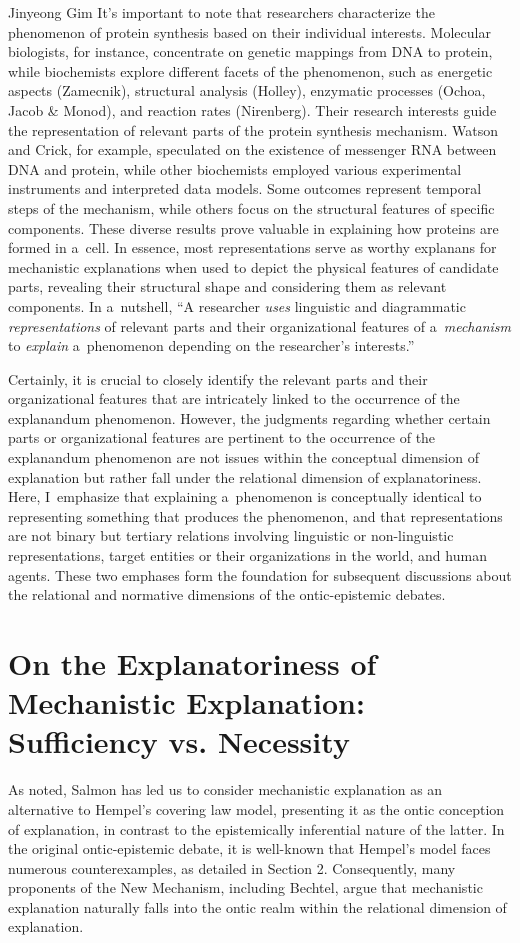 \begin{artengenv}{Jinyeong Gim}
It's important to note that researchers characterize the phenomenon of protein synthesis based on their individual interests. Molecular biologists, for instance, concentrate on genetic mappings from DNA to protein, while biochemists explore different facets of the phenomenon, such as energetic aspects (Zamecnik), structural analysis (Holley), enzymatic processes (Ochoa, Jacob \& Monod), and reaction rates (Nirenberg). Their research interests guide the representation of relevant parts of the protein synthesis mechanism. Watson and Crick, for example, speculated on the existence of messenger RNA between DNA and protein, while other biochemists employed various experimental instruments and interpreted data models. Some outcomes represent temporal steps of the mechanism, while others focus on the structural features of specific components. These diverse results prove valuable in explaining how proteins are formed in a~cell. In essence, most representations serve as worthy explanans for mechanistic explanations when used to depict the physical features of candidate parts, revealing their structural shape and considering them as relevant components. In a~nutshell, ``A researcher \textit{uses} linguistic and diagrammatic \textit{representations} of relevant parts and their organizational features of a~\textit{mechanism} to \textit{explain} a~phenomenon depending on the researcher's interests.''

Certainly, it is crucial to closely identify the relevant parts and their organizational features that are intricately linked to the occurrence of the explanandum phenomenon. However, the judgments regarding whether certain parts or organizational features are pertinent to the occurrence of the explanandum phenomenon are not issues within the conceptual dimension of explanation but rather fall under the relational dimension of explanatoriness. Here, I~emphasize that explaining a~phenomenon is conceptually identical to representing something that produces the phenomenon, and that representations are not binary but tertiary relations involving linguistic or non-linguistic representations, target entities or their organizations in the world, and human agents. These two emphases form the foundation for subsequent discussions about the relational and normative dimensions of the ontic-epistemic debates.

\section{On the Explanatoriness of Mechanistic Explanation: Sufficiency vs. Necessity}
As noted, Salmon has led us to consider mechanistic explanation as an alternative to Hempel's covering law model, presenting it as the ontic conception of explanation, in contrast to the epistemically inferential nature of the latter. In the original ontic-epistemic debate, it is well-known that Hempel's model faces numerous counterexamples, as detailed in Section 2. Consequently, many proponents of the New Mechanism, including Bechtel, argue that mechanistic explanation naturally falls into the ontic realm within the relational dimension of explanation.


\end{artengenv}
